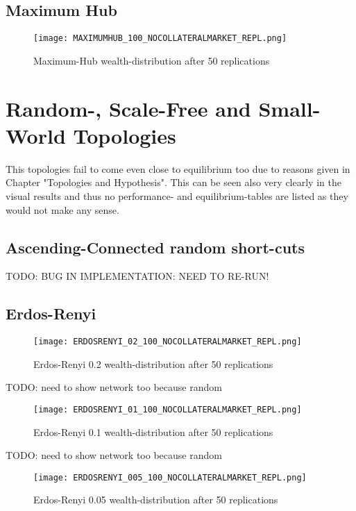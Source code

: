\documentclass[Bachelorarbeit.tex]{subfiles}
\begin{document}
\subsection{Maximum Hub}
\begin{figure}[!htbp]
	\centering
  \texttt{[image: MAXIMUMHUB\_100\_NOCOLLATERALMARKET\_REPL.png]}
	\caption{Maximum-Hub wealth-distribution after 50 replications}
	\label{fig1}
\end{figure}

\section{Random-, Scale-Free and Small-World Topologies}
This topologies fail to come even close to equilibrium too due to reasons given in Chapter "Topologies and Hypothesis". This can be seen also very clearly in the visual results and thus no performance- and equilibrium-tables are listed as they would not make any sense.

\subsection{Ascending-Connected random short-cuts}
TODO: BUG IN IMPLEMENTATION: NEED TO RE-RUN!


\subsection{Erdos-Renyi}
\begin{figure}[!htbp]
	\centering
  \texttt{[image: ERDOSRENYI\_02\_100\_NOCOLLATERALMARKET\_REPL.png]}
	\caption{Erdos-Renyi 0.2 wealth-distribution after 50 replications}
	\label{fig1}
\end{figure}

TODO: need to show network too because random

\begin{figure}[!htbp]
	\centering
  \texttt{[image: ERDOSRENYI\_01\_100\_NOCOLLATERALMARKET\_REPL.png]}
	\caption{Erdos-Renyi 0.1 wealth-distribution after 50 replications}
	\label{fig1}
\end{figure}

TODO: need to show network too because random

\begin{figure}[!htbp]
	\centering
  \texttt{[image: ERDOSRENYI\_005\_100\_NOCOLLATERALMARKET\_REPL.png]}
	\caption{Erdos-Renyi 0.05 wealth-distribution after 50 replications}
	\label{fig1}
\end{figure}
\end{document}
